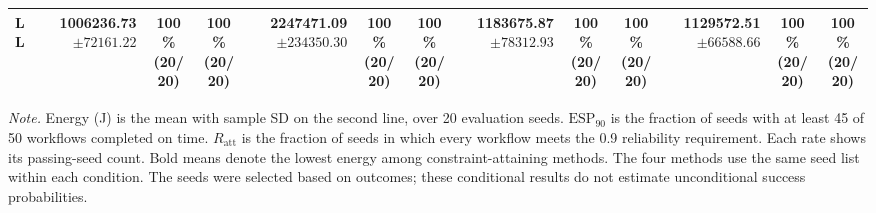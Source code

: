 \begin{table}[!t]
\begin{tabular}{@{}l*{4}{rcc}@{}}
LL & \shortstack[r]{\textbf{1006236.73}\\$\pm 72161.22$} & \shortstack[c]{100\%\\(20/20)} & \shortstack[c]{100\%\\(20/20)} & \shortstack[r]{2247471.09\\$\pm 234350.30$} & \shortstack[c]{100\%\\(20/20)} & \shortstack[c]{100\%\\(20/20)} & \shortstack[r]{1183675.87\\$\pm 78312.93$} & \shortstack[c]{100\%\\(20/20)} & \shortstack[c]{100\%\\(20/20)} & \shortstack[r]{1129572.51\\$\pm 66588.66$} & \shortstack[c]{100\%\\(20/20)} & \shortstack[c]{100\%\\(20/20)} \\
\bottomrule
\end{tabular}
\par\vspace{3pt}
\parbox{\textwidth}{\footnotesize
\textit{Note.} Energy (J) is the mean with sample SD on the second line, over 20 evaluation seeds.
$\mathrm{ESP}_{90}$ is the fraction of seeds with at least 45 of 50 workflows completed on time.
$R_{\mathrm{att}}$ is the fraction of seeds in which every workflow meets the 0.9 reliability requirement.
Each rate shows its passing-seed count. Bold means denote the lowest energy among constraint-attaining methods.
The four methods use the same seed list within each condition.
The seeds were selected based on outcomes; these conditional results do not estimate unconditional success probabilities.}
\endgroup
\end{table}
